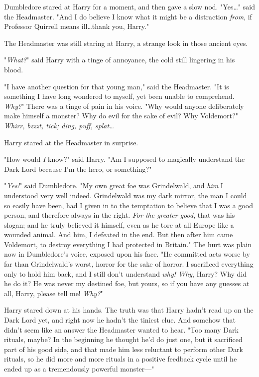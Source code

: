 Dumbledore stared at Harry for a moment, and then gave a slow nod.
"Yes…" said the Headmaster. "And I do believe I know what it might be a
distraction \emph{from}, if Professor Quirrell means ill…thank you,
Harry."

The Headmaster was still staring at Harry, a strange look in those ancient eyes.

"\emph{What?}" said Harry with a tinge of annoyance, the cold still lingering
in his blood.

"I have another question for that young man," said the Headmaster. "It is
something I have long wondered to myself, yet been unable to comprehend.
\emph{Why?}" There was a tinge of pain in his voice. "Why would anyone
deliberately make himself a monster? Why do evil for the sake of evil? Why
Voldemort?"
\later
\emph{Whirr, bzzzt, tick; ding, puff, splat…}

Harry stared at the Headmaster in surprise.

"How would \emph{I} know?" said Harry. "Am I supposed to magically understand
the Dark Lord because I’m the hero, or something?"

"\emph{Yes!}" said Dumbledore. "My own great foe was Grindelwald, and
\emph{him} I understood very well indeed. Grindelwald was my dark mirror, the
man I could so easily have been, had I given in to the temptation to believe
that I was a good person, and therefore always in the right. \emph{For the
greater good}, that was his slogan; and he truly believed it himself, even as
he tore at all Europe like a wounded animal. And him, I defeated in the end.
But then after him came Voldemort, to destroy everything I had protected in
Britain." The hurt was plain now in Dumbledore’s voice, exposed upon his face.
"He committed acts worse by far than Grindelwald’s worst, horror for the sake
of horror. I sacrificed everything only to hold him back, and I still don’t
understand \emph{why! Why}, Harry? Why did he do it? He was never my destined
foe, but yours, so if you have any guesses at all, Harry, please tell me!
\emph{Why?}"

Harry stared down at his hands. The truth was that Harry hadn’t read up on the
Dark Lord yet, and right now he hadn’t the tiniest clue. And somehow that
didn’t seem like an answer the Headmaster wanted to hear. "Too many Dark
rituals, maybe? In the beginning he thought he’d do just one, but it sacrificed
part of his good side, and that made him less reluctant to perform other Dark
rituals, so he did more and more rituals in a positive feedback cycle until he
ended up as a tremendously powerful monster—"

